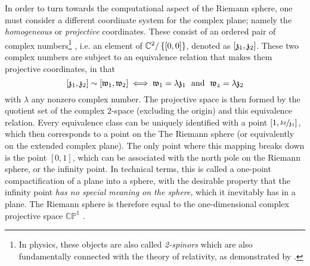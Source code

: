 In order to turn towards the computational aspect of the Riemann sphere, one must consider a different coordinate system for the complex plane; namely the \emph{homogeneous} or \emph{projective} coordinates. These consist of an ordered pair of complex numbers\footnote{In physics, these objects are also called \emph{2-spinors} which are also fundamentally connected with the theory of relativity, as demonstrated by \cite{Penrose1984}.} , i.e. an element of \(\mathbb{C}^2/\left\{[0, 0]\right\}\),  denoted as \(\qty[\mathfrak{z}_1, \mathfrak{z}_2]\). These two complex numbers are subject to an equivalence relation that makes them projective coordinates, in that \[\qty[\mathfrak{z}_1, \mathfrak{z}_2] \sim \qty[\mathfrak{w}_1, \mathfrak{w}_2] \iff \mathfrak{w}_1 = \lambda \mathfrak{z}_1\ \text{ and }\ \mathfrak{w_2} = \lambda \mathfrak{z}_2\]
with \(\lambda\) any nonzero complex number. The projective space is then formed by the quotient set of the complex 2-space (excluding the origin) and this equivalence relation. Every equivalence class can be uniquely identified with a point \([1, \sfrac{\mathfrak{z}_2}{\mathfrak{z}_1}]\), which then corresponds to a point on the The Riemann sphere (or equivalently on the extended complex plane). The only point where this mapping breaks down is the point \([0, 1]\), which can be associated with the north pole on the Riemann sphere, or the infinity point. In technical terms, this is called a one-point compactification of a plane into a sphere, with the desirable property that the infinity point \emph{has no special meaning on the sphere}, which it inevitably has in a plane. The Riemann sphere is therefore equal to the one-dimensional complex projective space \(\mathbb{CP}^1\) \cite{Thurston1997}. 

